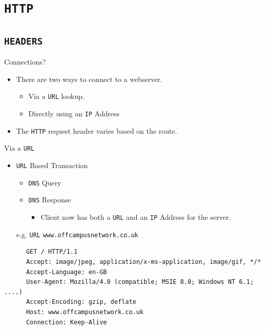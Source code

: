\documentclass[xcolor=table]{beamer}
\begin{document}
\section{\texttt{HTTP}}
\subsection{\texttt{HEADERS}}
\begin{frame}{Connections?}
  \begin{itemize}
    \item There are two ways to connect to a webserver.
      \begin{itemize}
        \item Via a \texttt{URL} lookup.
        \item Directly using an \texttt{IP} Address
      \end{itemize}
    \item The \texttt{HTTP} request header varies based on the route.
  \end{itemize}
\end{frame}

\begin{frame}[fragile]{Via a \texttt{URL}}
  \begin{itemize}
      \item \texttt{URL} Based Transaction
      \begin{itemize}
        \item \texttt{DNS} Query
        \item \texttt{DNS} Response
          \begin{itemize}
            \item Client now has both a \texttt{URL} and an \texttt{IP} Address for the server.
          \end{itemize}
      \end{itemize}
      \begin{center}
        e.g. \texttt{URL} \texttt{www.offcampusnetwork.co.uk}        
      \end{center}
    \end{itemize}
  \begin{tcolorbox}
    \lstset{
      basicstyle=\tiny\ttfamily,
    }
    \begin{lstlisting}
      GET / HTTP/1.1
      Accept: image/jpeg, application/x-ms-application, image/gif, */*
      Accept-Language: en-GB
      User-Agent: Mozilla/4.0 (compatible; MSIE 8.0; Windows NT 6.1; ....)
      Accept-Encoding: gzip, deflate
      Host: www.offcampusnetwork.co.uk
      Connection: Keep-Alive
    \end{lstlisting}
  \end{tcolorbox}
\end{frame}
\end{document}
